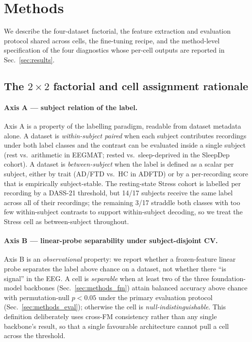 \section{Methods}
\label{sec:methods}

We describe the four-dataset factorial, the feature extraction and
evaluation protocol shared across cells, the fine-tuning recipe, and
the method-level specification of the four diagnostics whose per-cell
outputs are reported in Sec.~\ref{sec:results}.

\subsection{The $2\times 2$ factorial and cell assignment rationale}
\label{sec:methods_2x2}

\paragraph{Axis A --- subject relation of the label.}
Axis A is a property of the labelling paradigm, readable from dataset
metadata alone. A dataset is \emph{within-subject paired} when each
subject contributes recordings under both label classes and the
contrast can be evaluated inside a single subject (rest vs.\ arithmetic
in EEGMAT; rested vs.\ sleep-deprived in the SleepDep cohort). A
dataset is \emph{between-subject} when the label is defined as a
scalar per subject, either by trait (AD/FTD vs.\ HC in ADFTD) or by a
per-recording score that is empirically subject-stable. The
resting-state Stress cohort is labelled per recording by a DASS-21
threshold, but 14/17 subjects receive the same label across all of
their recordings; the remaining 3/17 straddle both classes with too
few within-subject contrasts to support within-subject decoding, so we
treat the Stress cell as between-subject throughout.

\paragraph{Axis B --- linear-probe separability under subject-disjoint
CV.} Axis B is an \emph{observational} property: we report whether a
frozen-feature linear probe separates the label above chance on a
dataset, not whether there ``is signal'' in the EEG. A cell is
\emph{separable} when at least two of the three foundation-model
backbones (Sec.~\ref{sec:methods_fm}) attain balanced accuracy above
chance with permutation-null $p<0.05$ under the primary evaluation
protocol (Sec.~\ref{sec:methods_eval}); otherwise the cell is
\emph{null-indistinguishable}. This definition deliberately uses
cross-FM consistency rather than any single backbone's result, so that
a single favourable architecture cannot pull a cell across the
threshold.

